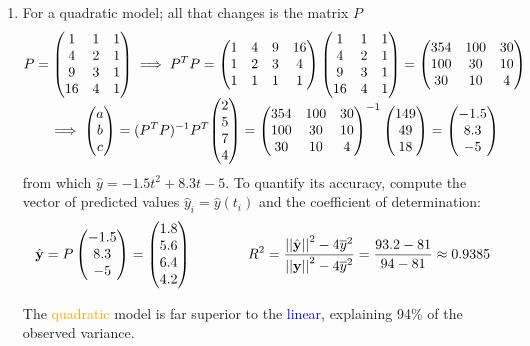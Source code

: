 \begin{example}{}{}
\begin{enumerate}
	\item For a quadratic model; all that changes is the matrix $P$%
	\begin{gather*}
		P=\begin{pmatrix}
		1&1&1\\
		4&2&1\\
		9&3&1\\
		16&4&1
		\end{pmatrix} \implies P^TP=\begin{pmatrix}
		1&4&9&16\\
		1&2&3&4\\
		1&1&1&1
		\end{pmatrix}\begin{pmatrix}
		1&1&1\\
		4&2&1\\
		9&3&1\\
		16&4&1
		\end{pmatrix}
		=\begin{pmatrix}
		354&100&30\\
		100&30&10\\
		30&10&4
		\end{pmatrix}\\
		\implies \begin{pmatrix}a\\b\\c\end{pmatrix}=(P^TP)^{-1}P^T\smash[t]{\begin{pmatrix}2\\5\\7\\4\end{pmatrix}}=\begin{pmatrix}
		354&100&30\\
		100&30&10\\
		30&10&4
		\end{pmatrix}^{-1}\begin{pmatrix}149\\49\\18\end{pmatrix}=\begin{pmatrix}-1.5\\8.3\\-5\end{pmatrix}
	\end{gather*}
	from which $\hat y=-1.5t^2+8.3t-5$. To quantify its accuracy, compute the vector of predicted values $\hat y_i=\hat y(t_i)$ and the coefficient of determination:
		\begin{gather*}
		\hat{{\mathbf{y}}}=P\begin{pmatrix}-1.5\\8.3\\-5\end{pmatrix}=\begin{pmatrix}1.8\\5.6\\6.4\\4.2\end{pmatrix}\qquad\qquad
		R^2=\frac{\left| \left| \hat{{\mathbf{y}}}\right|\right|^2-4\overline{y}^2}{\left| \left| {\mathbf{y}}\right|\right|^2-4\overline{y}^2}=\frac{93.2-81}{94-81} \approx 0.9385
		\end{gather*}\par
	
	\begin{minipage}[t]{0.58\linewidth}\vspace{-5pt}
		The \textcolor{orange}{quadratic} model is far superior to the \textcolor{blue}{linear}, explaining 94\% of the observed variance.
		

\end{minipage}
\end{enumerate}
\end{example}
